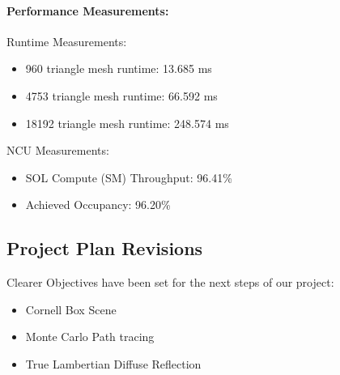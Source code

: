 \documentclass[12pt]{article}
\begin{document}
\paragraph{Performance Measurements:}

Runtime Measurements:
\begin{itemize}
    \item 960 triangle mesh runtime: 13.685 ms
    \item 4753 triangle mesh runtime: 66.592 ms
    \item 18192 triangle mesh runtime: 248.574 ms
\end{itemize}

NCU Measurements:
\begin{itemize}
    \item SOL Compute (SM) Throughput: 96.41\%
    \item Achieved Occupancy: 96.20\%
\end{itemize}
\subsection*{Project Plan Revisions}

Clearer Objectives have been set for the next steps of our project:

\begin{itemize}
    \item Cornell Box Scene
    \item Monte Carlo Path tracing
    \item True Lambertian Diffuse Reflection
\end{itemize}
\end{document}

